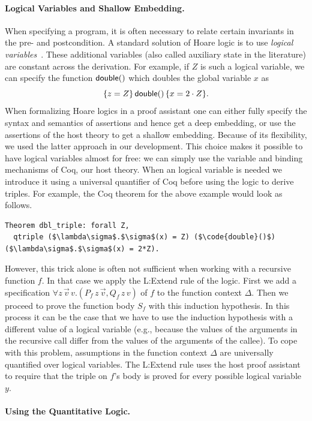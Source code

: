 \documentclass{sigplanconf}
\begin{document}
{\paragraph{Logical Variables and Shallow Embedding.}

When specifying a program, it is often necessary to relate certain
invariants in the pre- and postcondition.  A standard solution of Hoare
logic is to use \emph{logical variables}~\cite{Kleymann99}.  These
additional variables (also called auxiliary state in the literature)
are constant across the derivation.  For example, if $Z$ is such
a logical variable, we can specify the function $\mathsf{double}()$
which doubles the global variable $x$ as
$$
  \{z = Z\}\, \mathsf{double}()\, \{x = 2 \cdot Z\}.
$$
%
When formalizing Hoare logics in a proof assistant one can either
fully specify the syntax and semantics of assertions and hence get a
deep embedding, or use the assertions of the host theory to get a
shallow embedding.  Because of its flexibility, we used the latter
approach in our development.  This choice makes it possible to have
logical variables almost for free: we can simply use the variable and
binding mechanisms of Coq, our host theory.  When an logical variable
is needed we introduce it using a universal quantifier of Coq before
using the logic to derive triples.  For example, the Coq theorem for
the above example would look as follows.
%
\begin{lstlisting}
Theorem dbl_triple: forall Z,
  qtriple ($\lambda\sigma$.$\sigma$(x) = Z) ($\code{double}()$) ($\lambda\sigma$.$\sigma$(x) = 2*Z).
\end{lstlisting}
%
However, this trick alone is often not sufficient when working with a
recursive function $f$.  In that case we apply the {\sc L:Extend} rule
of the logic.  First we add a specification $\forall z\,\vec
v\,v.(P_f\,z\,\vec v, Q_f\,z\,v)$ of $f$ to the function context
$\Delta$.  Then we proceed to prove the function body $S_f$ with this
induction hypothesis.  In this process it can be the case that we have
to use the induction hypothesis with a different value of a logical
variable (e.g., because the values of the arguments in the recursive
call differ from the values of the arguments of the callee).  To cope
with this problem, assumptions in the function context $\Delta$ are
universally quantified over logical variables.  The {\sc L:Extend}
rule uses the host proof assistant to require that the triple on $f$'s
body is proved for every possible logical variable $y$.

\paragraph{Using the Quantitative Logic.}

}
\end{document}

